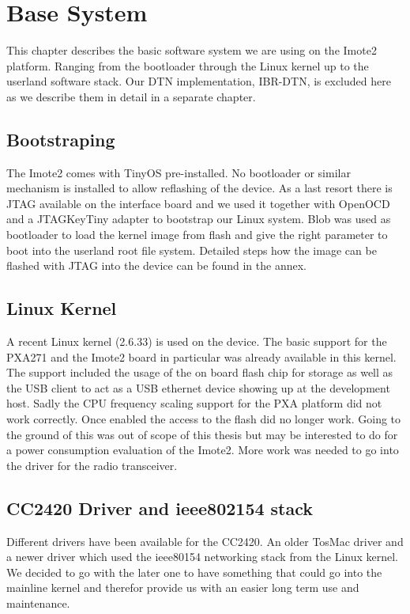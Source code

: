 \chapter{Base System}
This chapter describes the basic software system we are using on the Imote2
platform. Ranging from the bootloader through the Linux kernel up to the
userland software stack. Our DTN implementation, IBR-DTN, is excluded here as we
describe them in detail in a separate chapter.

\section{Bootstraping}
The Imote2 comes with TinyOS pre-installed. No bootloader or similar mechanism
is installed to allow reflashing of the device. As a last resort there is JTAG
available on the interface board and we used it together with OpenOCD and a
JTAGKeyTiny adapter to bootstrap our Linux system. Blob was used as bootloader to
load the kernel image from flash and give the right parameter to boot into the
userland root file system. Detailed steps how the image can be flashed with JTAG
into the device can be found in the annex.

\section{Linux Kernel}
A recent Linux kernel (2.6.33) is used on the device. The basic support for the
PXA271 and the Imote2 board in particular was already available in this kernel.
The support included the usage of the on board flash chip for storage as well as
the USB client to act as a USB ethernet device showing up at the development host.
Sadly the CPU frequency scaling support for the PXA platform did not work
correctly. Once enabled the access to the flash did no longer work. Going to the
ground of this was out of scope of this thesis but may be interested to do for a
power consumption evaluation of the Imote2. More work was needed to go into the
driver for the radio transceiver.

\section{CC2420 Driver and ieee802154 stack}
Different drivers have been available for the CC2420. An older TosMac driver and
a newer driver which used the ieee80154 networking stack from the Linux kernel.
We decided to go with the later one to have something that could go into the
mainline kernel and therefor provide us with an easier long term use and
maintenance.

